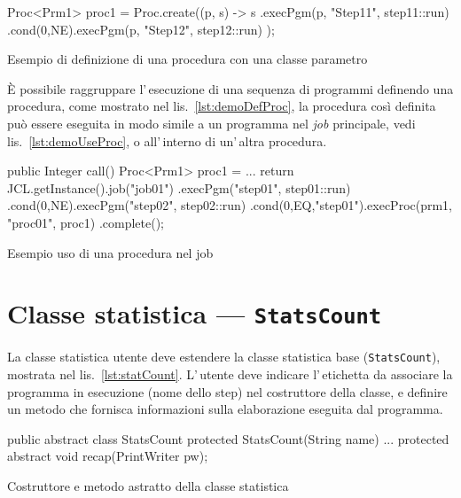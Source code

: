 \begin{elisting}[!htb]
\begin{javacode}
    Proc<Prm1> proc1 = Proc.create((p, s) -> s
        .execPgm(p, "Step11", step11::run)
        .cond(0,NE).execPgm(p, "Step12", step12::run)
    );
\end{javacode}
\caption{Esempio di definizione di una procedura con una classe parametro}
\label{lst:demoDefProc}
\end{elisting}
È possibile raggruppare l'\,esecuzione di una sequenza di programmi definendo
una procedura, come mostrato nel lis.~\ref{lst:demoDefProc}, la procedura così
definita può essere eseguita in modo simile a un programma nel \textit{job}
principale, vedi lis.~\ref{lst:demoUseProc}, o all'\,interno di un'\,altra
procedura.
\begin{elisting}[!htb]
\begin{javacode}
public Integer call() {
    Proc<Prm1> proc1 = ...
    return JCL.getInstance().job("job01")
        .execPgm("step01", step01::run)
        .cond(0,NE).execPgm("step02", step02::run)
        .cond(0,EQ,"step01").execProc(prm1, "proc01", proc1)
        .complete();
}
\end{javacode}
\caption{Esempio uso di una procedura nel job}
\label{lst:demoUseProc}
\end{elisting}




\section{Classe statistica --- \texttt{StatsCount}}\label{sec:statCount}
La classe statistica utente deve estendere la classe statistica base
(\texttt{StatsCount}), mostrata nel lis.~\ref{lst:statCount}.
L'\,utente deve indicare l'\,etichetta da associare la programma in esecuzione
(nome dello step) nel costruttore della classe, e definire un metodo che
fornisca informazioni sulla elaborazione eseguita dal programma.

\begin{elisting}[!htb]
\begin{javacode}
public abstract class StatsCount {
    protected StatsCount(String name) { ... }
    protected abstract void recap(PrintWriter pw);
}
\end{javacode}
\caption{Costruttore e metodo astratto della classe statistica}
\label{lst:statCount}
\end{elisting}
